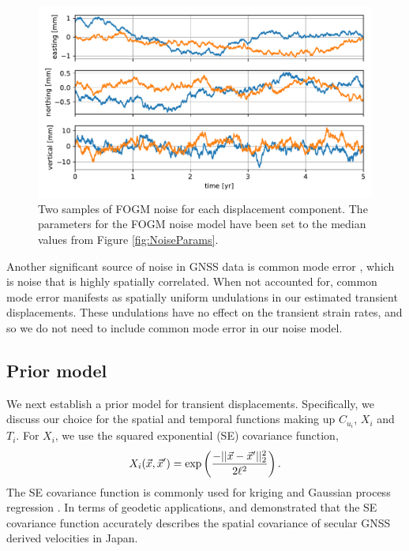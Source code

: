 \documentclass[extra,mreferee]{gji}
\begin{document}
\begin{figure}
\includegraphics{figures/noise/noise-samples.pdf}
\caption{
Two samples of FOGM noise for each displacement component. The
parameters for the FOGM noise model have been set to the median values
from Figure \ref{fig:NoiseParams}.
}   
\label{fig:NoiseSamples}
\end{figure}


Another significant source of noise in GNSS data is common mode error
\citep[e.g.,][]{Wdowinski1997,Dong2006}, which is noise that is highly
spatially correlated. When not accounted for, common mode error
manifests as spatially uniform undulations in our estimated transient
displacements. These undulations have no effect on the transient
strain rates, and so we do not need to include common mode error in
our noise model.

\subsection{Prior model}\label{sec:SignalModel}


We next establish a prior model for transient displacements.
Specifically, we discuss our choice for the spatial and temporal
functions making up $C_{u_i}$, $X_i$ and $T_i$. For $X_i$, we use the
squared exponential (SE) covariance function,
\begin{equation}\label{eq:SE}
X_i(\vec{x},\vec{x}') = \exp\left(\frac{-||\vec{x} - \vec{x}'||_2^2}{2 \ell^2}\right).
\end{equation}
The SE covariance function is commonly used for kriging
\citep[e.g,][]{Cressie1992} and Gaussian process regression
\citep[e.g.,][]{Rasmussen2006}. In terms of geodetic applications,
\citet{Kato1998} and \cite{El-Fiky1999} demonstrated that the SE
covariance function accurately describes the spatial covariance of
secular GNSS derived velocities in Japan.
\end{document}
